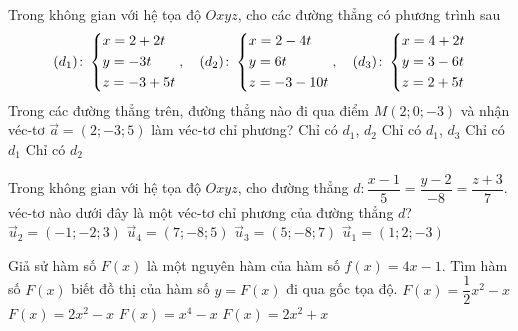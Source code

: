 \begin{ex}%
Trong không gian với hệ tọa độ $Oxyz$, cho các đường thẳng có phương trình sau 
\begin{align*}
(d_1)\colon\left\{\begin{aligned}& x=2+2t\\& y=-3t\\& z=-3+5t\end{aligned}\right.,
\quad (d_2)\colon\left\{\begin{aligned}& x=2-4t\\&y=6t\\& z=-3-10t\end{aligned}\right.,
\quad (d_3)\colon\left\{\begin{aligned}& x=4+2t\\& y=3-6t\\& z=2+5t\end{aligned}\right.
\end{align*}
Trong các đường thẳng trên, đường thẳng nào đi qua điểm $M(2;0;-3)$ và nhận véc-tơ $\overrightarrow{a}=(2;-3;5)$ làm véc-tơ chỉ phương?
\choice
{\True Chỉ có $d_1$, $d_2$}
{Chỉ có $d_1$, $d_3$}
{Chỉ có $d_1$}
{Chỉ có $d_2$}
\end{ex}

\begin{ex}%
Trong không gian với hệ tọa độ $Oxyz$, cho đường thẳng $d\colon\dfrac{x-1}{5}=\dfrac{y-2}{-8}=\dfrac{z+3}{7}$. véc-tơ nào dưới đây là một véc-tơ chỉ phương của đường thẳng $d$?
\choice
{$\overrightarrow{u}_2=(-1;-2;3)$}
{$\overrightarrow{u}_4=(7;-8;5)$}
{\True $\overrightarrow{u}_3=(5;-8;7)$}
{$\overrightarrow{u}_1=(1;2;-3)$}
\end{ex}

\begin{ex}%
Giả sử hàm số $F(x)$ là một nguyên hàm của hàm số $f(x)=4x-1$. Tìm hàm số $F(x)$ biết đồ thị của hàm số $y=F(x)$ đi qua gốc tọa độ.
\choice
{$F(x)=\dfrac{1}{2}x^2-x$}
{\True $F(x)=2x^2-x$}
{$F(x)=x^4-x$}
{$F(x)=2x^2+x$}
\end{ex}


